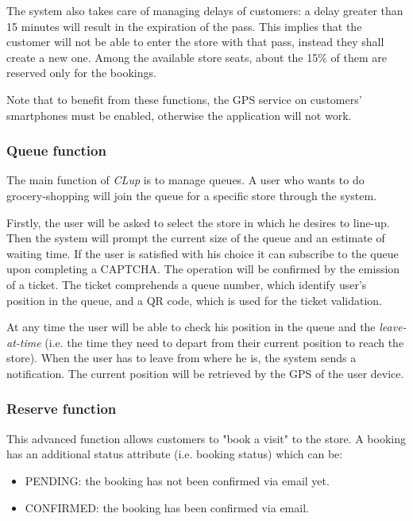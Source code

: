 	The system also takes care of managing delays of customers: a delay greater than 15 minutes will result in the expiration of the pass. This implies that the customer will not be able to enter the store with that pass, instead they shall create a new one.\newline
	Among the available store seats, about the 15\% of them are reserved only for the bookings.

	Note that to benefit from these functions, the GPS service on customers' smartphones must be enabled, otherwise the application will not work.

	\subsubsection{Queue function}
	The main function of \textit{CLup} is to manage queues. A user who wants to do grocery-shopping will join the queue for a specific store through the system.\newline

	Firstly, the user will be asked to select the store in which he desires to line-up.\newline
	Then the system will prompt the current size of the queue and an estimate of waiting time. If the user is satisfied with his choice it can subscribe to the queue upon completing a CAPTCHA. The operation will be confirmed by the emission of a ticket. The ticket comprehends a queue number, which identify user's position in the queue, and a QR code, which is used for the ticket validation.

	At any time the user will be able to check his position in the queue and the \textit{leave-at-time} (i.e. the time they need to depart from their current position to reach the store). When the user has to leave from where he is, the system sends a notification. The current position will be retrieved by the GPS of the user device.

	\subsubsection{Reserve function}
	This advanced function allows customers to "book a visit" to the store.
	A booking has an additional status attribute (i.e. booking status) which can be:
	\begin{itemize}
		\item PENDING: the booking has not been confirmed via email yet.
		\item CONFIRMED: the booking has been confirmed via email.
	\end{itemize}

